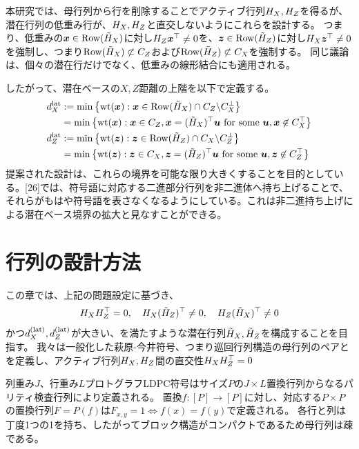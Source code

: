 \documentclass[a4paper,11pt,dvipdfmx]{jsarticle}
\theoremstyle{definition}
\begin{document}
本研究では、母行列から行を削除することでアクティブ行列$H_X,H_Z$を得るが、潜在行列の低重み行が、$H_X,H_Z$と直交しないようにこれらを設計する。
つまり、低重みの$\bm{x}\in\text{Row}(\tilde{H}_X)$に対し$H_Z\bm{x}^\top \neq 0$を、$\bm{z}\in\text{Row}(\tilde{H}_Z)$に対し$H_X\bm{z}^\top \neq 0$を強制し、つまり$\text{Row}(\tilde{H}_X)\not\subset C_Z$および$\text{Row}(\tilde{H}_Z)\not\subset C_X$を強制する。
同じ議論は、個々の潜在行だけでなく、低重みの線形結合にも適用される。

したがって、潜在ベースの$X,Z$距離の上階を以下で定義する。
\begin{align}
  d_X^{\text{lat}} &:= \min\left\{\text{wt}(\bm{x}):\bm{x}\in \text{Row}(\tilde{H}_X)\cap C_Z\backslash C_X^\perp\right\}\\
  &=\min\left\{\text{wt}(\bm{x}):\bm{x}\in C_Z, \bm{x}=(\tilde{H}_X)^\top\bm{u}\text{ for some }\bm{u}, \bm{x}\not\in C_X^\top\right\}\\
  d_Z^{\text{lat}} &:= \min\left\{\text{wt}(\bm{z}):\bm{z}\in \text{Row}(\tilde{H}_Z)\cap C_X\backslash C_Z^\perp\right\} \\
  &=\min\left\{\text{wt}(\bm{z}):\bm{z}\in C_X, \bm{z}=(\tilde{H}_Z)^\top\bm{u}\text{ for some }\bm{u}, \bm{z}\not\in C_Z^\top\right\}\\
\end{align}
提案された設計は、これらの境界を可能な限り大きくすることを目的としている。[26]では、符号語に対応する二進部分行列を非二進体へ持ち上げることで、それらがもはや符号語を表さなくなるようにしている。これは非二進持ち上げによる潜在ベース境界の拡大と見なすことができる。
\section{行列の設計方法}
この章では、上記の問題設定に基づき、
\begin{align}
H_XH_Z^\top = 0,\quad H_X(\tilde{H}_Z)^\top \neq 0, \quad H_Z(\tilde{H}_X)^\top \neq 0 
\end{align}
かつ$d_X^{(\text{lat})},d_Z^{(\text{lat})}$が大きい、を満たすような潜在行列$\tilde{H}_X,\tilde{H}_Z$を構成することを目指す。
我々は一般化した萩原-今井符号、つまり巡回行列構造の母行列のペアとを定義し、アクティブ行列$H_X,H_Z$間の直交性$H_XH_Z^\top = 0$

列重み$J$、行重み$L$プロトグラフLDPC符号はサイズ$P$の$J\times L$置換行列からなるパリティ検査行列により定義される。
置換$f:[P]\rightarrow[P]$に対し、対応する$P\times P$の置換行列$F=P(f)$は$F_{x,y}=1\iff f(x)=f(y)$で定義される。
各行と列は丁度1つの1を持ち、したがってブロック構造がコンパクトであるため母行列は疎である。
\end{document}
